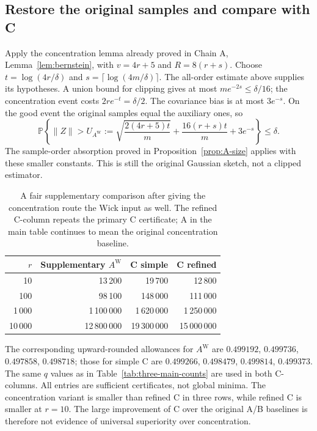 \documentclass[11pt]{article}
\numberwithin{equation}{section}
\theoremstyle{definition}\newtheorem{definition}[theorem]{Definition}
\theoremstyle{remark}\newtheorem{remark}[theorem]{Remark}
\begin{document}
\subsection{Restore the original samples and compare with C}
Apply the concentration lemma already proved in Chain A,
Lemma~\ref{lem:bernstein}, with $v=4r+5$ and $R=8(r+s)$.
Choose $t=\log(4r/\delta)$ and $s=\lceil\log(4m/\delta)\rceil$.
The all-order estimate above supplies its hypotheses. A union bound for
clipping gives at most $me^{-2s}\le\delta/16$; the concentration event costs
$2re^{-t}=\delta/2$. The covariance bias is at most $3e^{-s}$.
On the good event the original samples equal the auxiliary ones, so
\begin{equation}\label{aw:eq:tail}
 \mathbb P\left\{\|Z\|>
 U_{A^{\mathrm W}}:=
 \sqrt{\frac{2(4r+5)t}{m}}+
 \frac{16(r+s)t}{m}+3e^{-s}\right\}\le\delta.
\end{equation}
The sample-order absorption proved in Proposition~\ref{prop:A-size} applies
with these smaller constants. This is still the original Gaussian sketch,
not a clipped estimator.

\begin{table}[H]\centering\small
\setlength{\tabcolsep}{10pt}\renewcommand{\arraystretch}{1.2}
\begin{tabular}{@{}rrrr@{}}
\toprule
$r$&\textbf{Supplementary $A^{\mathrm W}$}&\textbf{C simple}&\textbf{C refined}\\
\midrule
10&13\,200&19\,700&12\,800\\
100&98\,100&148\,000&111\,000\\
1\,000&1\,100\,000&1\,620\,000&1\,250\,000\\
10\,000&12\,800\,000&19\,300\,000&15\,000\,000\\
\bottomrule
\end{tabular}
\caption{A fair supplementary comparison after giving the concentration route
the Wick input as well. The refined C-column repeats the primary C certificate;
A in the main table continues to mean the original concentration baseline.}
\label{tab:AWC}
\end{table}
The corresponding upward-rounded allowances for $A^{\mathrm W}$ are
$0.499192$, $0.499736$, $0.497858$, $0.498718$; those for simple C are
$0.499266$, $0.498479$, $0.499814$, $0.499373$.
The same $q$ values as in Table~\ref{tab:three-main-counts} are used in both C-columns.
All entries are sufficient certificates, not global minima. The concentration
variant is smaller than refined C in three rows, while refined C is smaller
at $r=10$. The large improvement of C over the original A/B baselines is
therefore not evidence of universal superiority over concentration.
\end{document}

